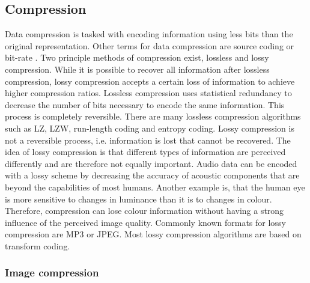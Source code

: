 \subsection{Compression}
Data compression is tasked with encoding information using less bits than the original representation. Other terms for data compression are source coding or bit-rate \cite{mahdi2012implementing}. Two principle methods of compression exist, lossless and lossy compression. While it is possible to recover all information after lossless compression, lossy compression accepts a certain loss of information to achieve higher compression ratios.
Lossless compression uses statistical redundancy to decrease the number of bits necessary to encode the same information. This process is completely reversible. There are many lossless compression algorithms such as LZ, LZW, run-length coding and entropy coding.
Lossy compression is not a reversible process, i.e. information is lost that cannot be recovered. The idea of lossy compression is that different types of information are perceived differently and are therefore not equally important. Audio data can be encoded with a lossy scheme by decreasing the accuracy of acoustic components that are beyond the capabilities of most humans. Another example is, that the human eye is more sensitive to changes in luminance than it is to changes in colour. Therefore, compression can lose colour information without having a strong influence of the perceived image quality. Commonly known formats for lossy compression are MP3 or JPEG. Most lossy compression algorithms are based on transform coding.

\subsubsection{Image compression}